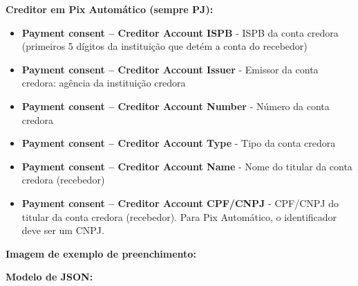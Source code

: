 \textbf{Creditor em Pix Automático (sempre PJ):}
\begin{itemize}
    \item \textbf{\textcolor{red!80}{Payment consent – Creditor Account ISPB}} - ISPB da conta credora (primeiros 5 dígitos da instituição que detém a conta do recebedor)
    \item \textbf{\textcolor{red!80}{Payment consent – Creditor Account Issuer}} - Emissor da conta credora: agência da instituição credora
    \item \textbf{\textcolor{red!80}{Payment consent – Creditor Account Number}} - Número da conta credora
    \item \textbf{\textcolor{red!80}{Payment consent – Creditor Account Type}} - Tipo da conta credora
    \item \textbf{\textcolor{red!80}{Payment consent – Creditor Account Name}} - Nome do titular da conta credora (recebedor)
    \item \textbf{\textcolor{red!80}{Payment consent – Creditor Account CPF/CNPJ}} - CPF/CNPJ do titular da conta credora (recebedor). Para Pix Automático, o identificador deve ser um CNPJ.
\end{itemize}

\textbf{Imagem de exemplo de preenchimento:}

\begin{figure}[H]
    \centering
    \label{fig:pagamentosautomaticos}
\end{figure}

\textbf{Modelo de JSON:}

